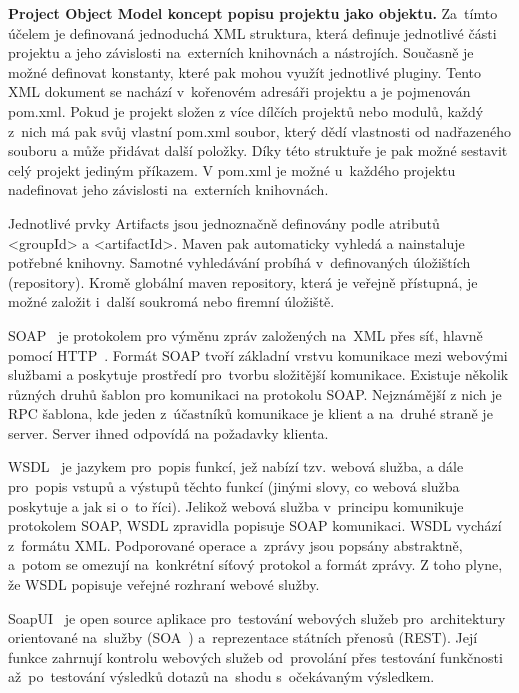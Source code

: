 \textbf{Project Object Model koncept popisu projektu jako objektu.} Za~tímto účelem je definovaná jednoduchá XML struktura, která definuje jednotlivé části projektu a jeho závislosti na~externích knihovnách a nástrojích. Současně je možné definovat konstanty, které pak mohou využít jednotlivé pluginy. Tento XML dokument se nachází v~kořenovém adresáři projektu a je pojmenován pom.xml. Pokud je projekt složen z více dílčích projektů nebo modulů, každý z~nich má pak svůj vlastní pom.xml soubor, který dědí vlastnosti od nadřazeného souboru a může přidávat další položky. Díky této struktuře je pak možné sestavit celý projekt jediným příkazem. V pom.xml je možné u~každého projektu nadefinovat jeho závislosti na~externích knihovnách. 

Jednotlivé prvky Artifacts jsou jednoznačně definovány podle atributů <groupId> a <artifactId>. Maven pak automaticky vyhledá a nainstaluje potřebné knihovny. Samotné vyhledávání probíhá v~definovaných úložištích (repository). Kromě globální maven repository, která je veřejně přístupná, je možné založit i~další soukromá nebo firemní úložiště.

SOAP~\cite{soap} je protokolem pro výměnu zpráv založených na~XML přes síť, hlavně pomocí HTTP~\cite{http}. Formát SOAP tvoří základní vrstvu komunikace mezi webovými službami a poskytuje prostředí pro~tvorbu složitější komunikace. Existuje několik různých druhů šablon pro komunikaci na protokolu SOAP. Nejznámější z nich je RPC šablona, kde jeden z~účastníků komunikace je klient a na~druhé straně je server. Server ihned odpovídá na požadavky klienta.

WSDL~\cite{wsdl} je jazykem pro~popis funkcí, jež nabízí tzv. webová služba, a dále pro~popis vstupů a výstupů těchto funkcí (jinými slovy, co webová služba poskytuje a jak si o~to říci). Jelikož webová služba v~principu komunikuje protokolem SOAP, WSDL zpravidla popisuje SOAP komunikaci. WSDL vychází z~formátu XML. Podporované operace a~zprávy jsou popsány abstraktně, a~potom se omezují na~konkrétní síťový protokol a formát zprávy. Z toho plyne, že WSDL popisuje veřejné rozhraní webové služby.

SoapUI~\cite{soapui} je open source aplikace pro~testování webových služeb pro~architektury orientované na~služby (SOA~\cite{soa}) a~reprezentace státních přenosů (REST). Její funkce zahrnují kontrolu webových služeb od~provolání přes testování funkčnosti až~po~testování výsledků dotazů na~shodu s~očekávaným výsledkem.

